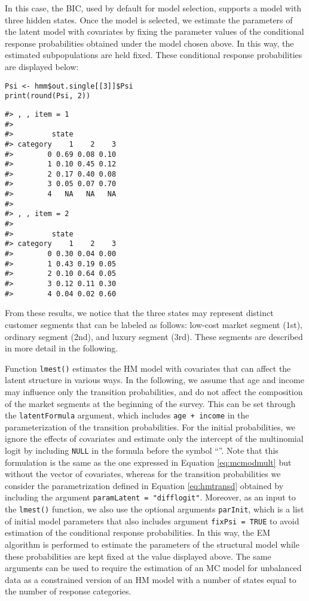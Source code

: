 In this case, the BIC, used by default for model selection, supports a
model with three hidden states. Once the model is selected, we estimate
the parameters of the latent model with covariates by fixing the
parameter values of the conditional response probabilities obtained
under the model chosen above. In this way, the estimated subpopulations
are held fixed. These conditional response probabilities are displayed
below:

\begin{verbatim}
Psi <- hmm$out.single[[3]]$Psi
print(round(Psi, 2))
\end{verbatim}

\begin{verbatim}
#> , , item = 1
#> 
#>         state
#> category    1    2    3
#>        0 0.69 0.08 0.10
#>        1 0.10 0.45 0.12
#>        2 0.17 0.40 0.08
#>        3 0.05 0.07 0.70
#>        4   NA   NA   NA
#> 
#> , , item = 2
#> 
#>         state
#> category    1    2    3
#>        0 0.30 0.04 0.00
#>        1 0.43 0.19 0.05
#>        2 0.10 0.64 0.05
#>        3 0.12 0.11 0.30
#>        4 0.04 0.02 0.60
\end{verbatim}

From these results, we notice that the three states may represent
distinct customer segments that can be labeled as follows: low-cost
market segment (1st), ordinary segment (2nd), and luxury segment (3rd).
These segments are described in more detail in the following.

Function \texttt{lmest()} estimates the HM model with covariates that can
affect the latent structure in various ways. In the following, we assume
that age and income may influence only the transition probabilities, and
do not affect the composition of the market segments at the beginning of
the survey. This can be set through the \texttt{latentFormula} argument, which
includes \texttt{age\ +\ income} in the parameterization of the transition
probabilities. For the initial probabilities, we ignore the effects of
covariates and estimate only the intercept of the multinomial logit by
including \texttt{NULL} in the formula before the symbol ``\texttt{\textbar{}}''. Note that this
formulation is the same as the one expressed in Equation
\eqref{eq:mcmodmult} but without the vector of covariates, whereas for
the transition probabilities we consider the parametrization defined in
Equation \eqref{eq:hmtransd} obtained by including the argument
\texttt{paramLatent\ =\ "difflogit"}. Moreover, as an input to the \texttt{lmest()}
function, we also use the optional arguments \texttt{parInit}, which is a list
of initial model parameters that also includes argument \texttt{fixPsi\ =\ TRUE}
to avoid estimation of the conditional response probabilities. In this
way, the EM algorithm is performed to estimate the parameters of the
structural model while these probabilities are kept fixed at the value
displayed above. The same arguments can be used to require the
estimation of an MC model for unbalanced data as a constrained version
of an HM model with a number of states equal to the number of response
categories.

